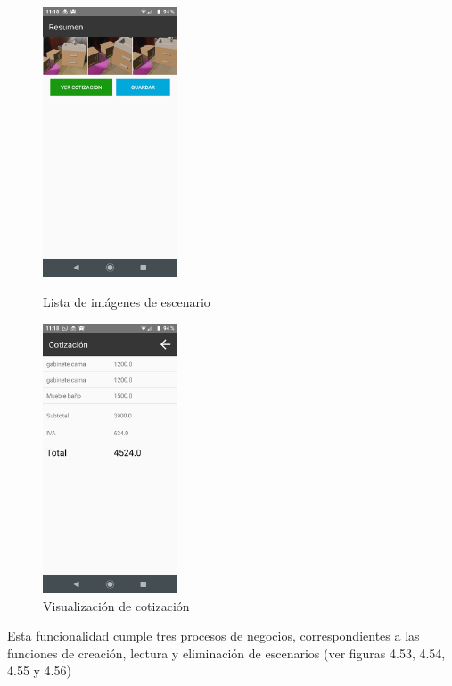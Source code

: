 \begin{figure}[hbt!]
	\begin{minipage}{0.32\textwidth}
		\centering
		\includegraphics[width=4cm,height=8cm]{imagenes/desarrollo/app/resumen.png}
		\caption{Lista de imágenes de escenario}
		\label{fig:scimg}
	\end{minipage}\hfill
	\begin{minipage}{0.32\textwidth}
		\centering
		\includegraphics[width=4cm,height=8cm]{imagenes/desarrollo/app/total.png}
		\caption{Visualización de cotización}
		\label{fig:coti}
	\end{minipage}\hfill
\end{figure}

Esta funcionalidad cumple tres procesos de negocios, correspondientes a las funciones de creación, lectura y eliminación de escenarios (ver figuras 4.53, 4.54, 4.55 y 4.56)

